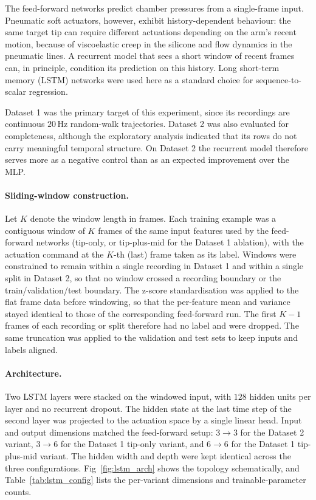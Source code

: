 The feed-forward networks predict chamber pressures from a single-frame input. Pneumatic soft actuators, however, exhibit history-dependent behaviour: the same target tip can require different actuations depending on the arm's recent motion, because of viscoelastic creep in the silicone and flow dynamics in the pneumatic lines. A recurrent model that sees a short window of recent frames can, in principle, condition its prediction on this history. Long short-term memory (LSTM) networks \cite{hochreiter1997lstm} were used here as a standard choice for sequence-to-scalar regression.

Dataset 1 was the primary target of this experiment, since its recordings are continuous $20$\,Hz random-walk trajectories. Dataset 2 was also evaluated for completeness, although the exploratory analysis indicated that its rows do not carry meaningful temporal structure. On Dataset 2 the recurrent model therefore serves more as a negative control than as an expected improvement over the MLP.

\paragraph{Sliding-window construction.}
Let $K$ denote the window length in frames. Each training example was a contiguous window of $K$ frames of the same input features used by the feed-forward networks (tip-only, or tip-plus-mid for the Dataset 1 ablation), with the actuation command at the $K$-th (last) frame taken as its label. Windows were constrained to remain within a single recording in Dataset 1 and within a single split in Dataset 2, so that no window crossed a recording boundary or the train/validation/test boundary. The z-score standardisation was applied to the flat frame data before windowing, so that the per-feature mean and variance stayed identical to those of the corresponding feed-forward run. The first $K-1$ frames of each recording or split therefore had no label and were dropped. The same truncation was applied to the validation and test sets to keep inputs and labels aligned.

\paragraph{Architecture.}
Two LSTM layers \cite{hochreiter1997lstm} were stacked on the windowed input, with $128$ hidden units per layer and no recurrent dropout. The hidden state at the last time step of the second layer was projected to the actuation space by a single linear head. Input and output dimensions matched the feed-forward setup: $3 \to 3$ for the Dataset 2 variant, $3 \to 6$ for the Dataset 1 tip-only variant, and $6 \to 6$ for the Dataset 1 tip-plus-mid variant. The hidden width and depth were kept identical across the three configurations. Fig~\ref{fig:lstm_arch} shows the topology schematically, and Table~\ref{tab:lstm_config} lists the per-variant dimensions and trainable-parameter counts.

